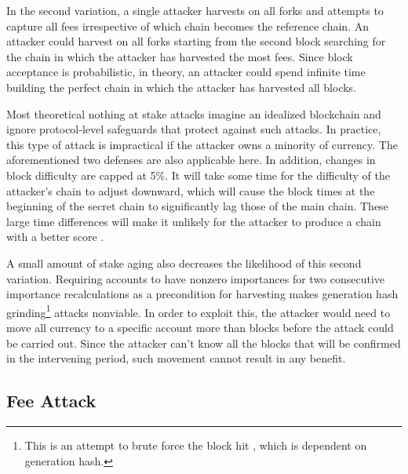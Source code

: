 In the second variation, a single attacker harvests on all forks and attempts to capture all fees irrespective of which chain becomes the reference chain.
An attacker could harvest on all forks starting from the second block searching for the chain in which the attacker has harvested the most fees.
Since block acceptance is probabilistic, in theory, an attacker could spend infinite time building the perfect chain in which the attacker has harvested all blocks.

Most theoretical nothing at stake attacks imagine an idealized blockchain and ignore protocol-level safeguards that protect against such attacks.
In practice, this type of attack is impractical if the attacker owns a minority of currency.
The aforementioned two defenses are also applicable here.
In addition, changes in block difficulty  are capped at 5\%.
It will take some time for the difficulty of the attacker's chain to adjust downward, which will cause the block times at the beginning of the secret chain to significantly lag those of the main chain.
These large time differences will make it unlikely for the attacker to produce a chain with a better score .

A small amount of stake aging also decreases the likelihood of this second variation.
Requiring accounts to have nonzero importances for two consecutive importance recalculations as a precondition for harvesting makes generation hash grinding\footnote{This is an attempt to brute force the block hit , which is dependent on generation hash.} attacks nonviable.
In order to exploit this, the attacker would need to move all currency to a specific account more than  blocks before the attack could be carried out.
Since the attacker can't know all the blocks that will be confirmed in the intervening period, such movement cannot result in any benefit.

\subsection{Fee Attack}
